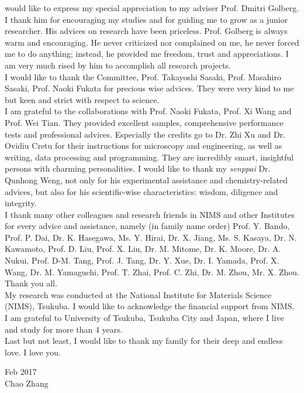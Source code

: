 
 would like to express my special appreciation to my adviser Prof. Dmitri Golberg. I thank him for encouraging my studies and for guiding me to grow as a junior researcher. His advices on research have been priceless. Prof. Golberg is always warm and encouraging. He never criticized nor complained on me, he never forced me to do anything; instead, he provided me freedom, trust and appreciations. I am very much rised by him to accomplish all research projects. \\
I would like to thank the Committee, Prof. Takayoshi Sasaki, Prof. Masahiro Sasaki, Prof. Naoki Fukata for precious wise advices. They were very kind to me but keen and strict with respect to science. \\
I am grateful to the collaborations with Prof. Naoki Fukata, Prof. Xi Wang and Prof. Wei Tian. They provided excellent samples, comprehensive performance tests and professional advices. 
Especially the credits go to Dr. Zhi Xu and Dr. Ovidiu Cretu for their instructions for microscopy and engineering, as well as writing, data processing and programming. They are incredibly smart, insightful persons with charming personalities. 
I would like to thank my {\em senppai} Dr. Qunhong Weng, not only for his experimental assistance and chemistry-related advices, but also for his scientific-wise characteristics: wisdom, diligence and integrity. \\
I thank many other colleagues and research friends in NIMS and other Institutes for every advice and assistance, namely (in family name order) Prof. Y. Bando, Prof. P. Dai, Dr. K. Hasegawa, Ms. Y. Hirai, Dr. X. Jiang, Ms. S. Kasaya, Dr. N. Kawamoto, Prof. D. Liu, Prof. X. Liu, Dr. M. Mitome, Dr. K. Moore, Dr. A. Nukui, Prof. D-M. Tang, Prof. J. Tang, Dr. Y. Xue, Dr. I. Yamada, Prof. X. Wang, Dr. M. Yamaguchi, Prof. T. Zhai, Prof. C. Zhi, Dr. M. Zhou, Mr. X. Zhou. Thank you all. 
\\
My research was conducted at the National Institute for Materials Science (NIMS), Tsukuba. I would like to acknowledge the financial support from NIMS.\\
I am grateful to University of Tsukuba, Tsukuba City and Japan, where I live and study for more than 4 years. \\
Last but not least, I would like to thank my family for their deep and endless love. I love you. \\[9ex]

\begin{flushright}
Feb 2017\\
Chao Zhang
\end{flushright}

